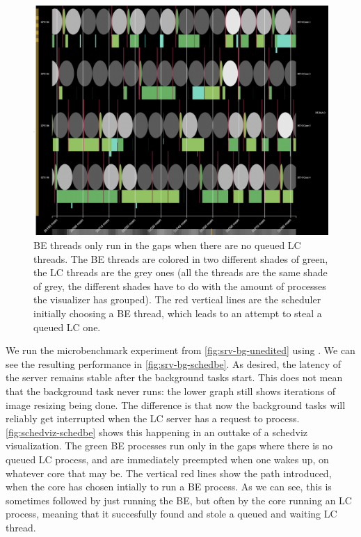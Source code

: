 \begin{figure}[t]
    \centering
    \includegraphics[width=\columnwidth]{graphs/schedviz-schedbe.png}
    \caption{BE threads only run in the gaps when there are no queued LC
    threads. The BE threads are colored in two different shades of green, the LC
    threads are the grey ones (all the threads are the same shade of grey, the
    different shades have to do with the amount of processes the visualizer has
    grouped). The red vertical lines are the scheduler initially choosing a BE
    thread, which leads to an attempt to steal a queued LC one.
    }\label{fig:schedviz-schedbe}
\end{figure}

We run the microbenchmark experiment from \autoref{fig:srv-bg-unedited} using
\schedbe{}. We can see the resulting performance in
\autoref{fig:srv-bg-schedbe}. As desired, the latency of the server remains
stable after the background tasks start. This does not mean that the background
task never runs: the lower graph still shows iterations of image resizing being
done. The difference is that now the background tasks will reliably get
interrupted when the LC server has a request to process.
\autoref{fig:schedviz-schedbe} shows this happening in an outtake of a schedviz
visualization. The green BE processes run only in the gaps where there is no
queued LC process, and are immediately preempted when one wakes up, on whatever
core that may be. The vertical red lines show the \exit{} path \schedbe{}
introduced, when the core has chosen intially to run a BE process. As we can
see, this is sometimes followed by just running the BE, but often by the core
running an LC process, meaning that it succesfully found and stole a queued and
waiting LC thread.

